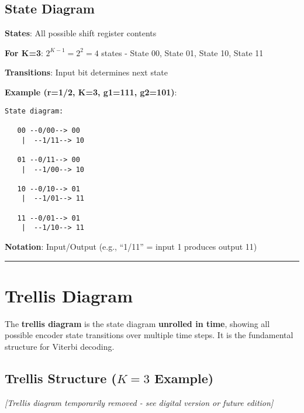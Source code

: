 \subsection{State Diagram}\label{state-diagram}

\textbf{States}: All possible shift register contents

\textbf{For K=3}: \(2^{K-1} = 2^2 = 4\) states - State 00, State 01,
State 10, State 11

\textbf{Transitions}: Input bit determines next state

\textbf{Example (r=1/2, K=3, g1=111, g2=101)}:

\begin{verbatim}
State diagram:

   00 --0/00--> 00
    |  --1/11--> 10
    
   01 --0/11--> 00
    |  --1/00--> 10
    
   10 --0/10--> 01
    |  --1/01--> 11
    
   11 --0/01--> 01
    |  --1/10--> 11
\end{verbatim}

\textbf{Notation}: Input/Output (e.g., ``1/11'' = input 1 produces
output 11)

\begin{center}\rule{0.5\linewidth}{0.5pt}\end{center}

\section{Trellis Diagram}

The \textbf{trellis diagram} is the state diagram \textbf{unrolled in time}, showing all possible encoder state transitions over multiple time steps. It is the fundamental structure for Viterbi decoding.

\subsection{Trellis Structure ($K=3$ Example)}


\begin{center}
\textit{[Trellis diagram temporarily removed - see digital version or future edition]}
\end{center}

